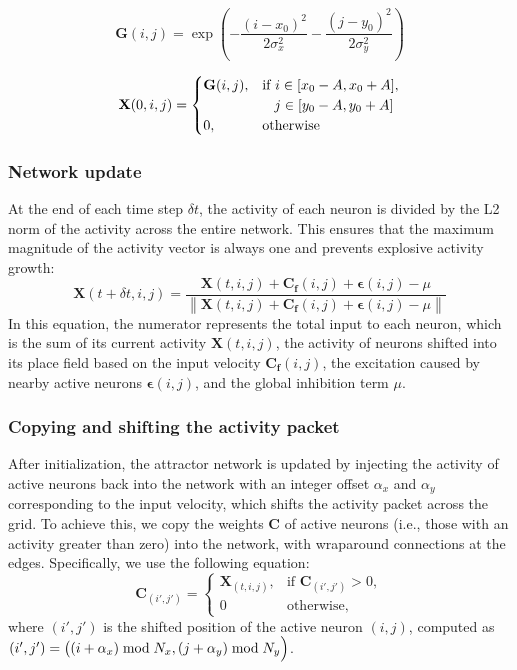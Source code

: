 \begin{equation}
\mathbf{G}(i,j) = \exp\left(-\frac{(i-x_0)^2}{2\sigma_x^2} - \frac{(j-y_0)^2}{2\sigma_y^2}\right)
\end{equation}

\begin{equation}
    \mathbf{X}(0,i,j) =
    \begin{cases}
        \mathbf{G}(i,j), & \text{if } i\in[x_0-A,x_0+A], \\
          & \hspace{-0.4cm}\qquad j\in[y_0-A,y_0+A] \\
        0, & \text{otherwise}
    \end{cases}
\end{equation}

\subsubsection{\textbf{Network update}}
At the end of each time step $\delta t$, the activity of each neuron is divided by the L2 norm of the activity across the entire network. This ensures that the maximum magnitude of the activity vector is always one and prevents explosive activity growth:
\begin{equation}
\mathbf{X}(t+\delta t,i,j) = \frac{\mathbf{X}(t,i,j)+\mathbf{C_f}(i,j)+\boldsymbol\epsilon(i,j)-\mu}{\left\| \mathbf{X}(t,i,j)+\mathbf{C_f}(i,j)+\boldsymbol\epsilon(i,j)-\mu \right\|}
\end{equation}
In this equation, the numerator represents the total input to each neuron, which is the sum of its current activity $\mathbf{X}(t,i,j)$, the activity of neurons shifted into its place field based on the input velocity $\mathbf{C_f}(i,j)$, the excitation caused by nearby active neurons $\boldsymbol\epsilon(i,j)$, and the global inhibition term $\mu$.

\subsubsection{\textbf{Copying and shifting the activity packet}}

After initialization, the attractor network is updated by injecting the activity of active neurons back into the network with an integer offset $\alpha_x$ and $\alpha_y$ corresponding to the input velocity, which shifts the activity packet across the grid. To achieve this, we copy the weights $\mathbf{C}$ of active neurons (i.e., those with an activity greater than zero) into the network, with wraparound connections at the edges. Specifically, we use the following equation:
\begin{equation}
\mathbf{C}_{(i',j')} = \begin{cases}
\mathbf{X}_{(t,i,j)}, & \text{if } \mathbf{C}_{(i',j')} >0, \\
0 & \mathrm{otherwise},
\end{cases}
\end{equation}
where $(i',j')$ is the shifted position of the active neuron $(i,j)$, computed as $(i',j') = \bigl((i+\alpha_x) \bmod N_x,  (j+\alpha_y)\bmod N_y\Bigl)$. 

